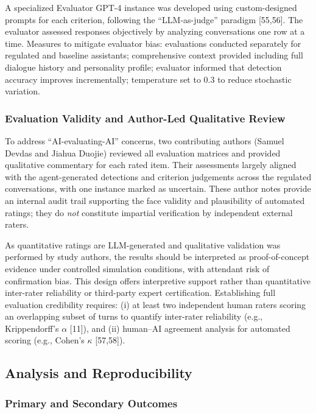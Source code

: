 A specialized Evaluator GPT-4 instance was developed using custom-designed prompts for each criterion, following the ``LLM-as-judge'' paradigm {[}55,56{]}. The evaluator assessed responses objectively by analyzing conversations one row at a time. Measures to mitigate evaluator bias: evaluations conducted separately for regulated and baseline assistants; comprehensive context provided including full dialogue history and personality profile; evaluator informed that detection accuracy improves incrementally; temperature set to 0.3 to reduce stochastic variation.

\subsubsection{Evaluation Validity and Author-Led Qualitative Review}\label{evaluation-validity-and-author-validation}

To address ``AI-evaluating-AI'' concerns, two contributing authors (Samuel Devdas and Jiahua Duojie) reviewed all evaluation matrices and provided qualitative commentary for each rated item. Their assessments largely aligned with the agent-generated detections and criterion judgements across the regulated conversations, with one instance marked as uncertain. These author notes provide an internal audit trail supporting the face validity and plausibility of automated ratings; they do \emph{not} constitute impartial verification by independent external raters.

As quantitative ratings are LLM-generated and qualitative validation was performed by study authors, the results should be interpreted as proof-of-concept evidence under controlled simulation conditions, with attendant risk of confirmation bias. This design offers interpretive support rather than quantitative inter-rater reliability or third-party expert certification. Establishing full evaluation credibility requires: (i) at least two independent human raters scoring an overlapping subset of turns to quantify inter-rater reliability (e.g., Krippendorff's $\alpha$ {[}11{]}), and (ii) human--AI agreement analysis for automated scoring (e.g., Cohen's $\kappa$ {[}57,58{]}).

\subsection{Analysis and Reproducibility}\label{analysis-and-reproducibility}

\subsubsection{Primary and Secondary Outcomes}\label{primary-and-secondary-outcomes}

